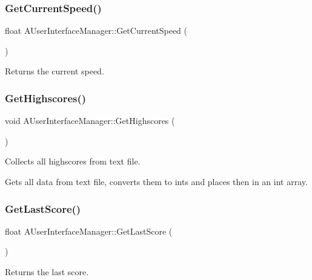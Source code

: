 \mbox{\label{class_a_user_interface_manager_ab204b19e791bb6df7513e7cd72fe712a}} 
\subsubsection{GetCurrentSpeed()}
{\footnotesize\ttfamily float A\+User\+Interface\+Manager\+::\+Get\+Current\+Speed (\begin{DoxyParamCaption}{ }\end{DoxyParamCaption})}



Returns the current speed. 

\mbox{\label{class_a_user_interface_manager_a60cd439b46ed433c1d37b9eb5da7a419}} 
\subsubsection{GetHighscores()}
{\footnotesize\ttfamily void A\+User\+Interface\+Manager\+::\+Get\+Highscores (\begin{DoxyParamCaption}{ }\end{DoxyParamCaption})}



Collects all highscores from text file. 

Gets all data from text file, converts them to ints and places then in an int array. \mbox{\label{class_a_user_interface_manager_a172fb08ed68ad0d6c60d9ebcac38e6de}} 
\subsubsection{GetLastScore()}
{\footnotesize\ttfamily float A\+User\+Interface\+Manager\+::\+Get\+Last\+Score (\begin{DoxyParamCaption}{ }\end{DoxyParamCaption})}



Returns the last score. 

\mbox{\label{class_a_user_interface_manager_ae8fbb5d467e403f4f8e6a871c77a2a97}} 
